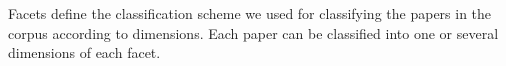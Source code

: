 

Facets define the classification scheme we used for  classifying the papers in the corpus according to dimensions. 
Each paper can be classified into one or several dimensions of each facet. 
